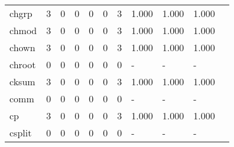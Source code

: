 \begin{longtable}{lp{1.10cm}p{1.10cm}p{1.10cm}p{1.10cm}p{1.10cm}p{1.10cm}p{1.10cm}p{1.10cm}p{1.10cm}p{1.10cm}}
chgrp     &                      3 &                                  0 &                                 0 &                                0 &                                 0 &                               3 &                          1.000 &                                 1.000 &                               1.000 \\
chmod     &                      3 &                                  0 &                                 0 &                                0 &                                 0 &                               3 &                          1.000 &                                 1.000 &                               1.000 \\
chown     &                      3 &                                  0 &                                 0 &                                0 &                                 0 &                               3 &                          1.000 &                                 1.000 &                               1.000 \\
chroot    &                      0 &                                  0 &                                 0 &                                0 &                                 0 &                               0 &                              - &                                     - &                                   - \\
cksum     &                      3 &                                  0 &                                 0 &                                0 &                                 0 &                               3 &                          1.000 &                                 1.000 &                               1.000 \\
comm      &                      0 &                                  0 &                                 0 &                                0 &                                 0 &                               0 &                              - &                                     - &                                   - \\
cp        &                      3 &                                  0 &                                 0 &                                0 &                                 0 &                               3 &                          1.000 &                                 1.000 &                               1.000 \\
csplit    &                      0 &                                  0 &                                 0 &                                0 &                                 0 &                               0 &                              - &                                     - &                                   - \\

\end{longtable}
